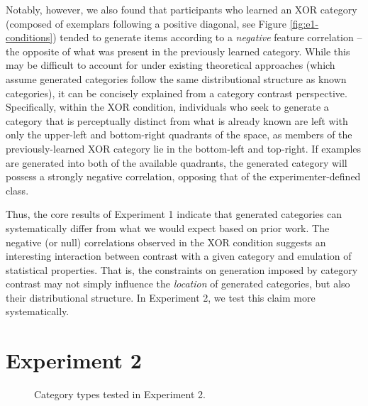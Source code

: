 \documentclass[12pt]{article}
\begin{document}
\begin{flushleft}
Notably, however, we also found that participants who learned an XOR category
(composed of exemplars following a positive diagonal, see Figure
\ref{fig:e1-conditions}) tended to generate items according to a {\em negative}
feature correlation -- the opposite of what was present in the previously
learned category. While this may be difficult to account for under existing
theoretical approaches (which assume generated categories follow the same
distributional structure as known categories), it can be concisely explained
from a category contrast perspective. Specifically, within the XOR condition,
individuals who seek to generate a category that is perceptually distinct from
what is already known are left with only the upper-left and bottom-right
quadrants of the space, as members of the previously-learned XOR category lie in
the bottom-left and top-right. If examples are generated into both of the
available quadrants, the generated category will possess a strongly negative
correlation, opposing that of the experimenter-defined class.

Thus, the core results of Experiment 1 indicate that generated categories can
systematically differ from what we would expect based on prior work. The
negative (or null) correlations observed in the XOR condition suggests an
interesting interaction between contrast with a given category and emulation of
statistical properties. That is, the constraints on generation imposed by
category contrast may not simply influence the {\em location} of generated
categories, but also their distributional structure. In Experiment 2, we test
this claim more systematically.


\section{Experiment 2}

\begin{figure}
    \begin{center} 
    \caption{Category types tested in Experiment 2.}
    \label{fig:e2-conditions}
    \end{center}
\end{figure}


\end{flushleft}
\end{document}
